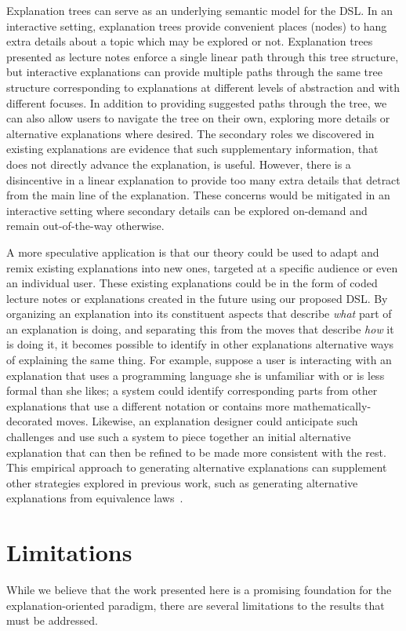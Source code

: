 \documentclass[sigconf]{acmart}
\begin{document}
Explanation trees can serve as an underlying semantic model for the DSL.
%
In an interactive setting, explanation trees provide convenient places (nodes)
to hang extra details about a topic which may be explored or not. Explanation
trees presented as lecture notes enforce a single linear path through this tree
structure, but interactive explanations can provide multiple paths through the
same tree structure corresponding to explanations at different levels of
abstraction and with different focuses. In addition to providing suggested
paths through the tree, we can also allow users to navigate the tree on their
own, exploring more details or alternative explanations where desired.
%
The secondary roles we discovered in existing explanations are evidence that
such supplementary information, that does not directly advance the explanation,
is useful. However, there is a disincentive in a linear explanation to provide
too many extra details that detract from the main line of the explanation.
These concerns would be mitigated in an interactive setting where secondary
details can be explored on-demand and remain out-of-the-way otherwise.


A more speculative application is that our theory could be used to adapt and
remix existing explanations into new ones, targeted at a specific audience or
even an individual user.
%
These existing explanations could be in the form of coded lecture notes or
explanations created in the future using our proposed DSL.
%
By organizing an explanation into its constituent aspects that describe
\emph{what} part of an explanation is doing, and separating this from the moves
that describe \emph{how} it is doing it, it becomes possible to identify in
other explanations alternative ways of explaining the same thing.
%
For example, suppose a user is interacting with an explanation that uses a
programming language she is unfamiliar with or is less formal than she likes; a
system could identify corresponding parts from other explanations that use a
different notation or contains more mathematically-decorated moves. Likewise,
an explanation designer could anticipate such challenges and use such a system
to piece together an initial alternative explanation that can then be refined
to be made more consistent with the rest.
%
This empirical approach to generating alternative explanations can supplement
other strategies explored in previous work, such as generating alternative
explanations from equivalence laws~\cite{EW13jvlc}.

\section{Limitations}
While we believe that the work presented here is a promising foundation for
the explanation-oriented paradigm, there are several limitations to the
results that must be addressed.
\end{document}
